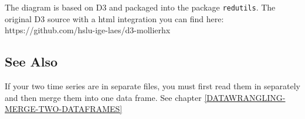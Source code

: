 \documentclass[
]{book}
\newcommand{\passthrough}[1]{#1}
\begin{document}
The diagram is based on D3 and packaged into the package \passthrough{\lstinline!redutils!}. The original D3 source with a html integration you can find here: https://github.com/hslu-ige-laes/d3-mollierhx

\hypertarget{see-also}{%
\subsection{See Also}\label{see-also}}

If your two time series are in separate files, you must first read them in separately and then merge them into one data frame. See chapter \ref{DATAWRANGLING-MERGE-TWO-DATAFRAMES}

  
\end{document}

